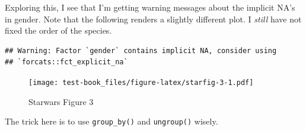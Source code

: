 \documentclass[]{book}
\newenvironment{Shaded}{\begin{snugshade}}{\end{snugshade}}
\newcommand{\DataTypeTok}[1]{\textcolor[rgb]{0.13,0.29,0.53}{#1}}
\newcommand{\DecValTok}[1]{\textcolor[rgb]{0.00,0.00,0.81}{#1}}
\newcommand{\KeywordTok}[1]{\textcolor[rgb]{0.13,0.29,0.53}{\textbf{#1}}}
\newcommand{\NormalTok}[1]{#1}
\newcommand{\OperatorTok}[1]{\textcolor[rgb]{0.81,0.36,0.00}{\textbf{#1}}}
\newcommand{\OtherTok}[1]{\textcolor[rgb]{0.56,0.35,0.01}{#1}}
\newcommand{\StringTok}[1]{\textcolor[rgb]{0.31,0.60,0.02}{#1}}
\begin{document}
Exploring this, I see that I'm getting warning messages about the implicit NA's in gender. Note that the following renders a slightly different plot. I \emph{still} have not fixed the order of the species.

\begin{Shaded}
\end{Shaded}

\begin{verbatim}
## Warning: Factor `gender` contains implicit NA, consider using
## `forcats::fct_explicit_na`
\end{verbatim}

\begin{figure}
\centering
\texttt{[image: test-book\_files/figure-latex/starfig-3-1.pdf]}
\caption{\label{fig:starfig-3}Starwars Figure 3}
\end{figure}

The trick here is to use \texttt{group\_by()} and \texttt{ungroup()} wisely.
\end{document}

